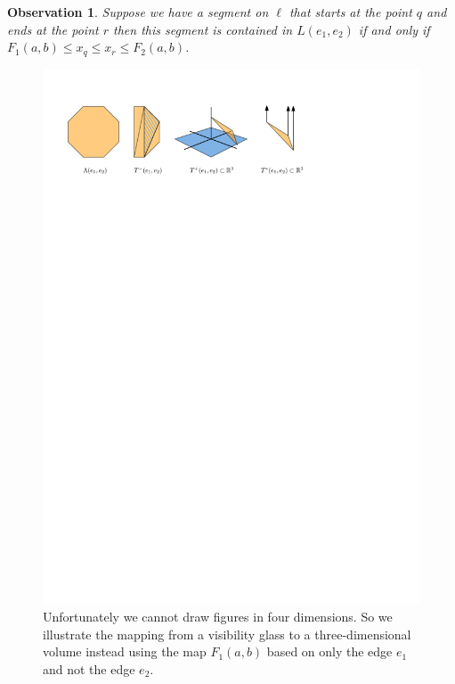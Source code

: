 \documentclass[UKenglish]{lipics-v2019}
\newtheorem{observation}{Observation}
\begin{document}
\begin{observation}
Suppose we have a segment on $\ell$ that starts at the point $q$ and ends at the point $r$ then this segment is contained in $L(e_1, e_2)$ if and only if $F_1(a,b) \le x_{q} \le x_{r} \le F_2(a,b)$.
\end{observation}


\begin{figure} [tb]
	\centering \includegraphics {threedimensional} 
	\caption
	{
	  Unfortunately we cannot draw figures in four dimensions. So we illustrate the mapping from a visibility glass to a three-dimensional volume instead using the map $F_1(a,b)$ based on only the edge $e_1$ and not the edge $e_2$.  
	}  
	\label{fig:threedimensional}
\end{figure}
\end{document}
